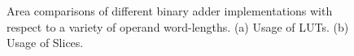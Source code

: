 \documentclass[conference]{IEEEtran}
\begin{document}
\begin{figure}[tbp]
  \centering
  \caption{Area comparisons of different binary adder implementations with respect to a variety of operand word-lengths. (a) Usage of LUTs. (b) Usage of Slices.}
  \label{Fig:AdderArea}
\end{figure} 
\end{document}
